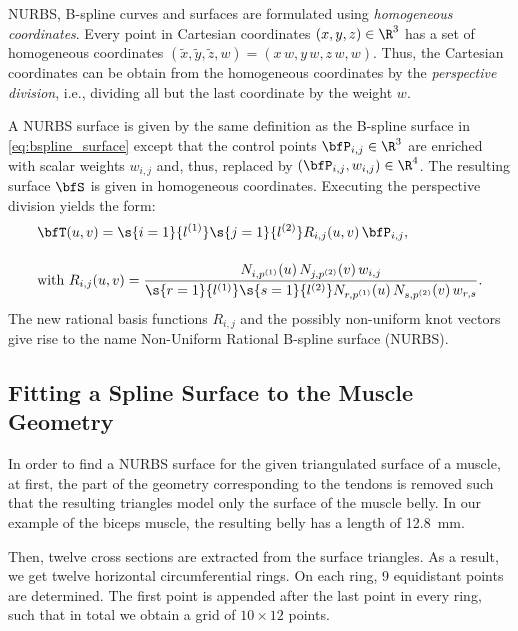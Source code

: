 NURBS, B-spline curves and surfaces are formulated using \emph{homogeneous coordinates}. Every point in Cartesian coordinates $(x,y,z) \in \R^3$ has a set of homogeneous coordinates $(\tilde{x},\tilde{y},\tilde{z},w)=(x\,w,y\,w,z\,w,w)$. Thus, the Cartesian coordinates can be obtain from the homogeneous coordinates by the \emph{perspective division}, i.e., dividing all but the last coordinate by the weight $w$.

A NURBS surface is given by the same definition as the B-spline surface in \cref{eq:bspline_surface} except that the control points $\bfP_{i,j} \in \R^3$ are enriched with scalar weights $w_{i,j}$ and, thus, replaced by $(\bfP_{i,j}, w_{i,j}) \in \R^4$. The resulting surface $\bfS$ is given in homogeneous coordinates. Executing the perspective division yields the form:
%
\begin{align*}
  &\bfT(u,v) = \s{i=1}{l^{(1)}}\s{j=1}{l^{(2)}} R_{i,j}(u,v) \,\bfP_{i,j},\\[4mm]
  &\text{with } R_{i,j}(u,v) = \dfrac{N_{i,p^{(1)}}(u)\,N_{j,p^{(2)}}(v)\,w_{i,j}}{\s{r=1}{l^{(1)}}\s{s=1}{l^{(2)}} N_{r,p^{(1)}}(u)\,N_{s,p^{(2)}}(v)\,w_{r,s}}.
\end{align*}
The new rational basis functions $R_{i,j}$ and the possibly non-uniform knot vectors give rise to the name Non-Uniform Rational B-spline surface (NURBS).

\subsection{Fitting a Spline Surface to the Muscle Geometry}
In order to find a NURBS surface for the given triangulated surface of a muscle, at first, the part of the geometry corresponding to the tendons is removed such that the resulting triangles model only the surface of the muscle belly. In our example of the biceps muscle, the resulting belly has a length of \SI{12.8}{\mm}.

Then, twelve cross sections are extracted from the surface triangles. As a result, we get twelve horizontal circumferential rings. On each ring, 9 equidistant points are determined. The first point is appended after the last point in every ring, such that in total we obtain a grid of $10 \times 12$ points. 

